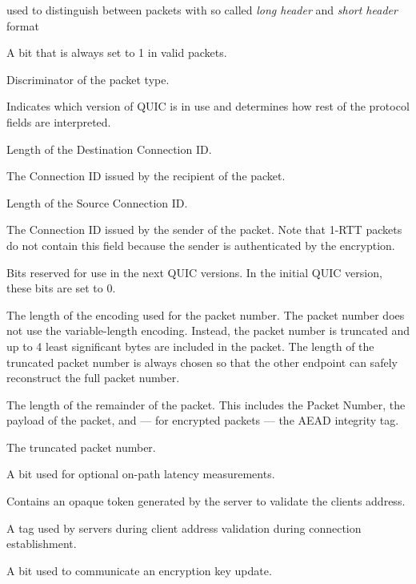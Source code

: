 \begin{description}

     used to distinguish between packets with so called \textit{long header}
    and \textit{short header} format

      A bit that is always set to 1 in valid packets.

     Discriminator of the packet type.

     Indicates which version of QUIC is in use and determines how rest of the
    protocol fields are interpreted.

     Length of the Destination Connection ID.

      The Connection ID issued by the recipient of the packet.

      Length of the Source Connection ID.

     The Connection ID issued by the sender of the packet. Note that
    1-RTT packets do not contain this field because the sender is authenticated by the encryption.

     Bits reserved for use in the next QUIC versions. In the initial QUIC
    version, these bits are set to 0.

    The length of the encoding used for the packet number. The packet number does not use the
    variable-length encoding. Instead, the packet number is truncated and up to 4 least significant
    bytes are included in the packet. The length of the truncated packet number is always chosen so
    that the other endpoint can safely reconstruct the full packet number.

     The length of the remainder
    of the packet. This includes the Packet Number, the payload of the packet, and --- for encrypted
    packets --- the AEAD integrity tag.

     The truncated packet
    number.

     A bit used for optional on-path latency measurements.

     Contains an opaque token generated by the server to validate the clients address.

     A tag used by servers during client
    address validation during connection establishment.

     A bit used to communicate an encryption key update.

\end{description}

